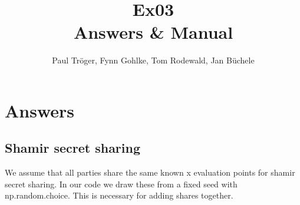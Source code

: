 \documentclass{article}
\begin{document}
	
	\title{\vspace{-1.5cm}Ex03 \\ Answers \& Manual}
	\author{Paul Tr\"oger, Fynn Gohlke, Tom Rodewald, Jan B\"uchele}
	
	\maketitle
	
	\section{Answers}
		\subsection{Shamir secret sharing}
            We assume that all parties share the same known x evaluation points for shamir secret sharing. In our code we draw these from a fixed seed with np.random.choice. This is necessary for adding shares together.
\end{document}
